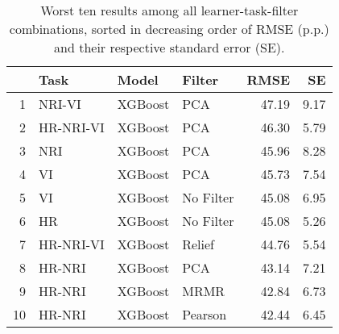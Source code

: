 \begin{table}[ht!]
\centering
\caption{Worst ten results among all learner-task-filter combinations, sorted in decreasing order of RMSE (p.p.) and their respective standard error (SE).} 
\label{tab:perf-worst-10}
\begin{tabular}{rlllrr}
  \hline
 & Task & Model & Filter & RMSE & SE \\ 
  \hline
1 & NRI-VI & XGBoost & PCA & 47.19 & 9.17 \\ 
  2 & HR-NRI-VI & XGBoost & PCA & 46.30 & 5.79 \\ 
  3 & NRI & XGBoost & PCA & 45.96 & 8.28 \\ 
  4 & VI & XGBoost & PCA & 45.73 & 7.54 \\ 
  5 & VI & XGBoost & No Filter & 45.08 & 6.95 \\ 
  6 & HR & XGBoost & No Filter & 45.08 & 5.26 \\ 
  7 & HR-NRI-VI & XGBoost & Relief & 44.76 & 5.54 \\ 
  8 & HR-NRI & XGBoost & PCA & 43.14 & 7.21 \\ 
  9 & HR-NRI & XGBoost & MRMR & 42.84 & 6.73 \\ 
  10 & HR-NRI & XGBoost & Pearson & 42.44 & 6.45 \\ 
   \hline
\end{tabular}
\end{table}
